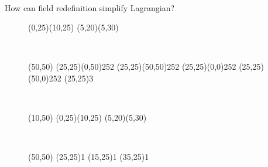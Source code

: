 \documentclass[aspectratio=169,usenames,dvipsnames]{beamer}
\begin{document}
\begin{frame}{\centering {}\\ How
    can field redefinition simplify Lagrangian?}
\begin{figure}
\begin{axopicture}
    \Line(0,25)(10,25)
    \Line(5,20)(5,30)
  \end{axopicture}\hspace{3mm}
  ~~~
  \begin{axopicture}(50,50)
    \DoublePhoton(25,25)(0,50){2}{5}{2}
    \DoublePhoton(25,25)(50,50){2}{5}{2}
    \DoublePhoton(25,25)(0,0){2}{5}{2}
    \DoublePhoton(25,25)(50,0){2}{5}{2}
    \Vertex(25,25){3}
  \end{axopicture}\hspace{3mm}
  ~~~
  \begin{axopicture}(10,50)
    \Line(0,25)(10,25)
    \Line(5,20)(5,30)
  \end{axopicture}
  ~~~
  \begin{axopicture}(50,50)
    \Vertex(25,25){1}
    \Vertex(15,25){1}
    \Vertex(35,25){1}
  \end{axopicture}
\end{figure}
\end{frame}
\end{document}
